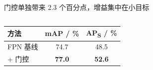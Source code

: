 \begin{frame}{门控单独带来 2.3 个百分点，增益集中在小目标}
  \begin{columns}[T, onlytextwidth]
    \begin{column}{0.5\textwidth}
      \begin{table}
        \centering\small
        \begin{tabular}{l S[table-format=2.1] S[table-format=2.1]}
          \toprule
          {方法} & {mAP / \%} & {AP\textsubscript{S} / \%} \\
          \midrule
          FPN 基线     & 74.7 & 48.5 \\
          + 门控       & \bfseries 77.0 & \bfseries 52.6 \\
          \bottomrule
        \end{tabular}
      \end{table}
    \end{column}
    \begin{column}{0.46\textwidth}
      \centering
    \end{column}
  \end{columns}
\end{frame}
